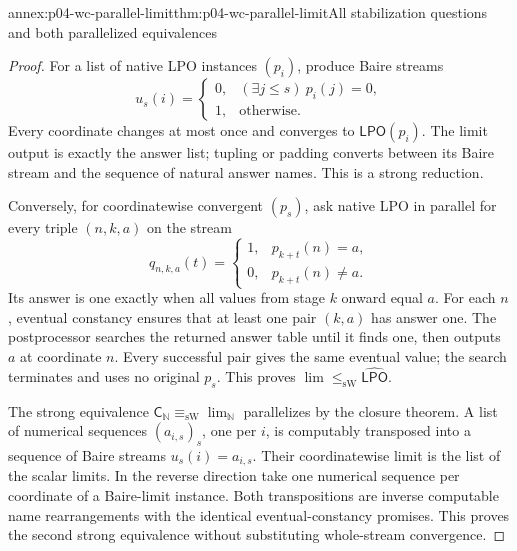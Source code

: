 \begin{annexitem}{annex:p04-wc-parallel-limit}{thm:p04-wc-parallel-limit}{All stabilization questions and both parallelized equivalences}
\begin{proof}
For a list of native LPO instances \((p_i)\), produce Baire streams
\[
 u_s(i)=\begin{cases}0,&(\exists j\leq s)\ p_i(j)=0,\\1,&\text{otherwise}.
 \end{cases}
\]
Every coordinate changes at most once and converges to
\(\mathsf{LPO}(p_i)\). The limit output is exactly the answer list;
tupling or padding converts between its Baire stream and the sequence
of natural answer names. This is a strong reduction.

Conversely, for coordinatewise convergent \((p_s)\), ask native LPO
in parallel for every triple \((n,k,a)\) on the stream
\[
 q_{n,k,a}(t)=
 \begin{cases}1,&p_{k+t}(n)=a,\\0,&p_{k+t}(n)\ne a.
 \end{cases}
\]
Its answer is one exactly when all values from stage \(k\) onward
equal \(a\). For each \(n\), eventual constancy ensures that at
least one pair \((k,a)\) has answer one. The postprocessor searches
the returned answer table until it finds one, then outputs \(a\)
at coordinate \(n\). Every successful pair gives the same eventual
value; the search terminates and uses no original \(p_s\).
This proves \(\lim\leq_{\mathrm{sW}}\widehat{\mathsf{LPO}}\).

The strong equivalence \(\mathsf{C}_{\mathbb N}\equiv_{\mathrm{sW}}\lim_{\mathbb N}\)
parallelizes by the closure theorem. A list of numerical sequences
\((a_{i,s})_s\), one per \(i\), is computably transposed into a
sequence of Baire streams \(u_s(i)=a_{i,s}\). Their coordinatewise
limit is the list of the scalar limits. In the reverse direction take
one numerical sequence per coordinate of a Baire-limit instance.
Both transpositions are inverse computable name rearrangements with
the identical eventual-constancy promises. This proves the second
strong equivalence without substituting whole-stream convergence.
\end{proof}
\end{annexitem}

